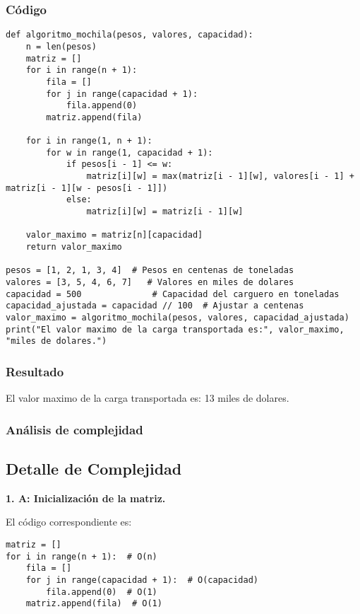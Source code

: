 \subsubsection{Código}
\begin{lstlisting}
def algoritmo_mochila(pesos, valores, capacidad):
    n = len(pesos)  
    matriz = []
    for i in range(n + 1):
        fila = []
        for j in range(capacidad + 1):
            fila.append(0)  
        matriz.append(fila)  

    for i in range(1, n + 1):  
        for w in range(1, capacidad + 1):  
            if pesos[i - 1] <= w:  
                matriz[i][w] = max(matriz[i - 1][w], valores[i - 1] + matriz[i - 1][w - pesos[i - 1]])  
            else:
                matriz[i][w] = matriz[i - 1][w]  

    valor_maximo = matriz[n][capacidad]
    return valor_maximo

pesos = [1, 2, 1, 3, 4]  # Pesos en centenas de toneladas
valores = [3, 5, 4, 6, 7]   # Valores en miles de dolares
capacidad = 500              # Capacidad del carguero en toneladas
capacidad_ajustada = capacidad // 100  # Ajustar a centenas
valor_maximo = algoritmo_mochila(pesos, valores, capacidad_ajustada)
print("El valor maximo de la carga transportada es:", valor_maximo, "miles de dolares.")
\end{lstlisting}

\subsubsection{Resultado}
El valor maximo de la carga transportada es: 13 miles de dolares.

\subsubsection{Análisis de complejidad}

\subsection*{Detalle de Complejidad}

\textbf{1. A: Inicialización de la matriz.}

El código correspondiente es:
\begin{lstlisting}
matriz = []
for i in range(n + 1):  # O(n)
    fila = []
    for j in range(capacidad + 1):  # O(capacidad)
        fila.append(0)  # O(1)
    matriz.append(fila)  # O(1)
\end{lstlisting}

